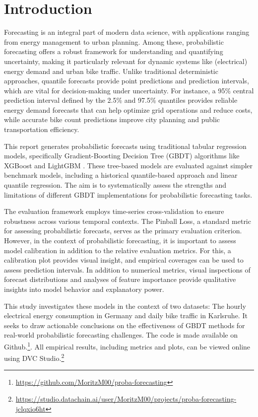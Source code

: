 \section{Introduction}
\label{ch:Introduction}


Forecasting is an integral part of modern data science, with applications ranging from energy management to urban planning. Among these, probabilistic forecasting offers a robust framework for understanding and quantifying uncertainty, making it particularly relevant for dynamic systems like (electrical) energy demand and urban bike traffic. Unlike traditional deterministic approaches, quantile forecasts provide point predictions and prediction intervals, which are vital for decision-making under uncertainty. For instance, a 95\% central prediction interval defined by the 2.5\% and 97.5\% quantiles provides reliable energy demand forecasts that can help optimize grid operations and reduce costs, while accurate bike count predictions improve city planning and public transportation efficiency.

This report generates probabilistic forecasts using traditional tabular regression models, specifically Gradient-Boosting Decision Tree (GBDT) algorithms like XGBoost \parencite{chen_xgboost_2016} and LightGBM \parencite{ke_lightgbm_2017}. These tree-based models are evaluated against simpler benchmark models, including a historical quantile-based approach and linear quantile regression. The aim is to systematically assess the strengths and limitations of different GBDT implementations for probabilistic forecasting tasks.

The evaluation framework employs time-series cross-validation to ensure robustness across various temporal contexts. The Pinball Loss, a standard metric for assessing probabilistic forecasts, serves as the primary evaluation criterion. However, in the context of probabilistic forecasting, it is important to assess model calibration in addition to the relative evaluation metrics. For this, a calibration plot provides visual insight, and empirical coverages can be used to assess prediction intervals.
In addition to numerical metrics, visual inspections of forecast distributions and analyses of feature importance provide qualitative insights into model behavior and explanatory power.

This study investigates these models in the context of two datasets: The hourly electrical energy consumption in Germany \parencite{noauthor_smard_nodate} and daily bike traffic in Karlsruhe. It seeks to draw actionable conclusions on the effectiveness of GBDT methods for real-world probabilistic forecasting challenges. The code is made available on Github.\footnote{\href{https://github.com/MoritzM00/proba-forecasting}{https://github.com/MoritzM00/proba-forecasting}}. All empirical results, including metrics and plots, can be viewed online using DVC Studio.\footnote{\href{https://studio.datachain.ai/user/MoritzM00/projects/proba-forecasting-jclqxio6ht}{https://studio.datachain.ai/user/MoritzM00/projects/proba-forecasting-jclqxio6ht}}

